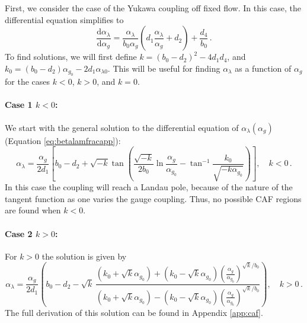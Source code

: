 First, we consider the case of the Yukawa coupling off fixed flow. In this case, the differential equation simplifies to
\begin{equation}
    \frac{\text{d} \alpha_\lambda}{\text{d}\alpha_g}=\frac{\alpha_\lambda}{b_0\alpha_g}\left(d_1\frac{\alpha_\lambda}{\alpha_g} + d_2\right)+\frac{d_4}{b_0}\,.
    \label{eq:betalamfracapp}
\end{equation}
To find solutions, we will first define $k = (b_0 - d_2)^2 - 4d_1 d_4$, and $k_0 = (b_0 - d_2)\alpha_{g_0} - 2d_1\alpha_{\lambda0}$.
This will be useful for finding $\alpha_\lambda$ as a function of $\alpha_g$ for the cases $k<0$, $k>0$, and $k=0$. 
\paragraph{Case 1 $k < 0$:}
We start with the general solution to the differential equation of $\alpha_\lambda(\alpha_g)$ (Equation \ref{eq:betalamfracapp}):
\begin{equation}
    \alpha_{\lambda} = \frac{\alpha_{g}}{2d_{1}} \left[ b_0 - d_2 + \sqrt{-k} \tan\left( \frac{\sqrt{-k}}{2b_0} \ln\frac{\alpha_g}{\alpha_{g_0}} - \tan^{-1}\frac{k_0}{\sqrt{-k\alpha_{g_0}}} \right) \right] , \quad k<0 \,.
    \label{eq:alphalamkl0}
\end{equation}
In this case the coupling will reach a Landau pole, because of the nature of the tangent function as one varies the gauge coupling. Thus, no possible CAF regions are found when $k<0$.

\paragraph{Case 2 $k > 0$:}
For $k>0$ the solution is given by
\begin{equation}
    \alpha_{\lambda} = \frac{\alpha_g}{2d_1} \left( b_0 - d_2 - \sqrt{k} \, \frac{ (k_0 + \sqrt{k}\alpha_{g_0}) + (k_0 - \sqrt{k}\alpha_{g_0}) \left( \frac{\alpha_g}{\alpha_{g_0}} \right)^{\sqrt{k}/b_0} }{ (k_0 + \sqrt{k}\alpha_{g_0}) - (k_0 - \sqrt{k}\alpha_{g_0}) \left( \frac{\alpha_g}{\alpha_{g_0}} \right)^{\sqrt{k}/b_0} } \right) , \quad k>0 \,.
    \label{eq:alphalamkg0}
\end{equation}
The full derivation of this solution can be found in Appendix \ref{app:caf}. 

